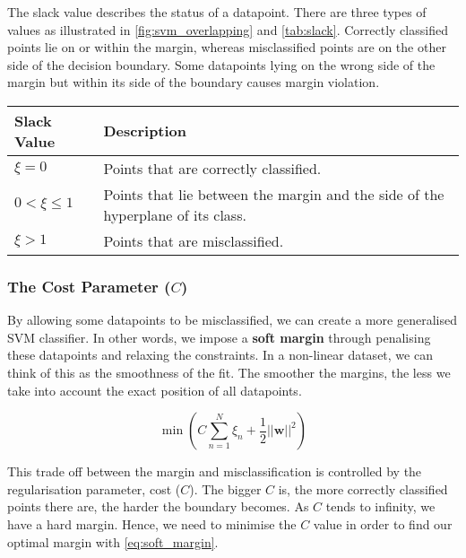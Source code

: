 The slack value describes the status of a datapoint. There are three types of values as illustrated in \autoref{fig:svm_overlapping} and \autoref{tab:slack}. Correctly classified points lie on or within the margin, whereas misclassified points are on the other side of the decision boundary. Some datapoints lying on the wrong side of the margin but within its side of the boundary causes margin violation.

\parbox{\linewidth} {
	\centering
  \begin{tabularx}{\textwidth}{|l|X|}
    \hline
    \textbf{Slack Value}	& \textbf{Description}
    \\ \hline
    $\xi = 0$ 					  & Points that are correctly classified.
    \\ \hline
    $0 < \xi \leq 1$     	& Points that lie between the margin and the side of the hyperplane of its class.
		\\ \hline
    $\xi > 1$  						& Points that are misclassified.
    \\ \hline

  \end{tabularx}
	\label{tab:slack}
}

\subsubsection{The Cost Parameter ($C$)}
By allowing some datapoints to be misclassified, we can create a more generalised SVM classifier. In other words, we impose a \textbf{soft margin} through penalising these datapoints and relaxing the constraints. In a non-linear dataset, we can think of this as the smoothness of the fit. The smoother the margins, the less we take into account the exact position of all datapoints. 

\begin{equation} \label{eq:soft_margin}
	\min \left ( C \sum_{n=1}^{N} \xi_{n} + \frac{1}{2}||\mathbf{w}||^2 \right )
\end{equation}

This trade off between the margin and misclassification is controlled by the regularisation parameter, cost ($C$). The bigger $C$ is, the more correctly classified points there are, the harder the boundary becomes. As $C$ tends to infinity, we have a hard margin. Hence, we need to minimise the $C$ value in order to find our optimal margin with \autoref{eq:soft_margin}.

